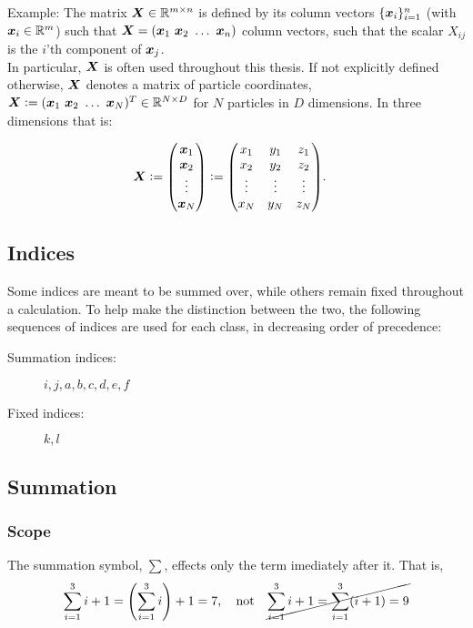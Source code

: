 \documentclass[Thesis.tex]{subfiles}
\begin{document}
Example: The matrix $\bm{X}\in\mathbb{R}^{m\times n}$ is defined by its column
vectors $\{\bm{x}_i\}_{i=1}^n$ (with $\bm{x}_i\in\mathbb{R}^{m}$) such that $ \bm{X} =
(\bm{x}_1\ \bm{x}_2\ \dots\ \bm{x}_n)$ column vectors, such that the scalar $X_{ij}$ is
the $i$'th component of $\bm{x}_j$.\\

In particular, $\bm{X}$ is often used throughout this thesis. If not explicitly
defined otherwise, $\bm{X}$ denotes a matrix of particle coordinates, $\bm{X}
\vcentcolon= (\bm{x}_1\ \bm{x}_2\ \dots\ \bm{x}_N)^T\in \mathbb{R}^{N\times D}$ for $N$
particles in $D$ dimensions. In three dimensions that is:

\begin{align}
  \mat X &\defeq \mqty(\vx_1\\\vx_2\\\vdots\\\vx_N) \defeq \mqty(x_1&y_1&z_1\\x_2&y_2&z_2\\\vdots&\vdots&\vdots\\x_N&y_N&z_N).
\end{align}

\subsection{Indices}

Some indices are meant to be summed over, while others remain fixed throughout a
calculation. To help make the distinction between the two, the following
sequences of indices are used for each class, in decreasing order of
precedence:

\begin{description}
\item[Summation indices:] $i, j, a, b, c, d, e, f$
\item[Fixed indices:] $k, l$
\end{description}

\subsection{Summation}

\subsubsection{Scope}

The summation symbol, $\sum$, effects only the term imediately after it. That
is,
\begin{align}
  \sum_{i=1}^3 i + 1 = \qty(\sum_{i=1}^3 i) + 1 = 7, \qq{not} \cancel{\sum_{i=1}^3i + 1 = \sum_{i=1}^3(i + 1) = 9}
\end{align}
\end{document}
